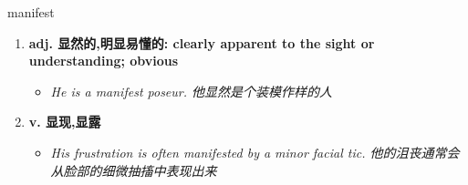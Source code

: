 
\begin{frame}
{\huge manifest}
\begin{center}
\begin{enumerate}\Large
  \item \textbf{adj. 显然的,明显易懂的: clearly apparent to the sight or understanding; obvious}
  \begin{itemize}
    \item \em{\Large{He is a manifest poseur. 他显然是个装模作样的人}}
  \end{itemize}
  \item \textbf{v. 显现,显露}
  \begin{itemize}
    \item \em{\Large{His frustration is often manifested by a minor facial tic. 他的沮丧通常会从脸部的细微抽搐中表现出来}}
  \end{itemize}
\end{enumerate}
\end{center}
\end{frame}
